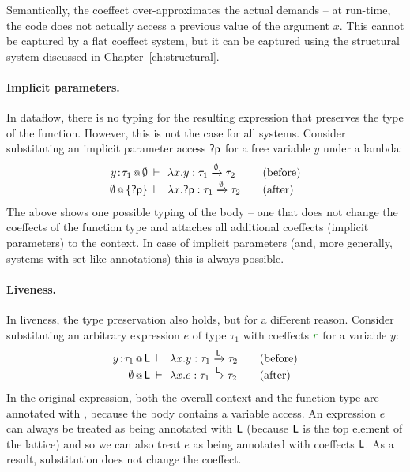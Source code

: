 Semantically, the coeffect over-approximates the actual demands -- at run-time, the code does not
actually access a previous value of the argument $x$. This cannot be captured by a flat coeffect
system, but it can be captured using the structural system discussed in Chapter~\ref{ch:structural}.

\paragraph{Implicit parameters.} In dataflow, there is no typing for the resulting expression that
preserves the type of the function. However, this is not the case for all systems. Consider substituting
an implicit parameter access $\textnormal{\sffamily ?p}$ for a free variable $y$ under a lambda:
%
\begin{equation*}
\begin{array}{rclcl}
 \coctx{y\!:\!\tau_1}{\emptyset} &\narrow{\vdash}& \lambda x.y : \tau_1 \xrightarrow{\emptyset} \tau_2 & & (\textnormal{before}) \\
 \coctx{\emptyset}{ \{\ident{?p}\} } &\narrow{\vdash}& \lambda x.\ident{?p} : \tau_1 \xrightarrow{\emptyset} \tau_2 & & (\textnormal{after}) \\
\end{array}
\end{equation*}
%
The above shows one possible typing of the body -- one that does not change the coeffects of the
function type and attaches all additional coeffects (implicit parameters) to the context. In case
of implicit parameters (and, more generally, systems with set-like annotations) this is always
possible.

\paragraph{Liveness.} In liveness, the type preservation also holds, but for a different reason. Consider
substituting an arbitrary expression $e$ of type $\tau_1$ with coeffects $\cclrd{r}$ for a variable $y$:
%
\begin{equation*}
\begin{array}{rclcl}
 \coctx{y\!:\!\tau_1}{\ident{L}} &\narrow{\vdash}& \lambda x.y : \tau_1 \xrightarrow{\ident{L}} \tau_2 & & (\textnormal{before}) \\
 \coctx{\emptyset}{\ident{L}} &\narrow{\vdash}& \lambda x.e : \tau_1 \xrightarrow{\ident{L}} \tau_2 & & (\textnormal{after}) \\
\end{array}
\end{equation*}
%
In the original expression, both the overall context and the function type are annotated with ,
because the body contains a variable access. An expression $e$ can always be treated as being annotated
with $\textnormal{\sffamily L}$ (because $\textnormal{\sffamily L}$ is the top element of the lattice) and so we can also treat $e$
as being annotated with coeffects $\textnormal{\sffamily L}$. As a result, substitution does not change the coeffect.

